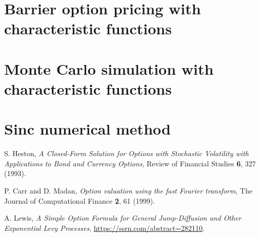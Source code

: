 \documentclass[12pt]{article}
\begin{document}
\section{Barrier option pricing with characteristic functions}



\section{Monte Carlo simulation with characteristic functions}



\appendix

\section{Sinc numerical method}



\begin{thebibliography}{99}
    S. Heston, {\it A Closed-Form Solution for Options with Stochastic Volatility with Applications to Bond and Currency Options}, Review of Financial Studies {\bf 6}, 327 (1993).

    P. Carr and D. Madan, {\it Option valuation using the fast Fourier transform}, The Journal of Computational Finance {\bf 2}, 61 (1999).

    A. Lewis, {\it A Simple Option Formula for General Jump-Diffusion and Other Exponential Levy Processes}, \url{https://ssrn.com/abstract=282110}.

\end{thebibliography}
\end{document}
